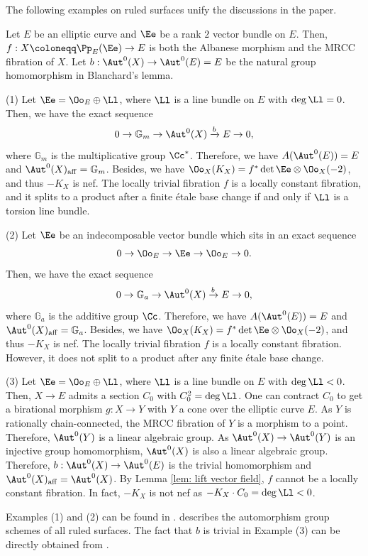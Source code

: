 \documentclass[11pt]{amsart}
\begin{document}
\begin{example}
The following examples on ruled surfaces unify the discussions in the paper. 

Let $E$ be an elliptic curve and $\Ee$ be a rank $2$ vector bundle on $E$. Then, $f: X \coloneqq \Pp_E(\Ee) \to E$ is both the Albanese morphism and the MRCC fibration of $X$. Let $b: \Aut^0(X) \to \Aut^0(E)=E$ be the natural group homomorphism in Blanchard's lemma.

(1) Let $\Ee = \Oo_E \oplus \Ll$, where $\Ll$ is a line bundle on $E$ with $\deg \Ll =0$. Then, we have the exact sequence 
\[
0 \to {\mathbb G}_m \to \Aut^0(X) \xrightarrow{b} E \to 0,
\] where ${\mathbb G}_m$ is the multiplicative group $\Cc^*$. Therefore, we have $A(\Aut^0(E))=E$ and $\Aut^0(X)_{\rm aff}={\mathbb G}_m$. Besides, we have $\Oo_X(K_X)=f^*\det \Ee \otimes \Oo_X(-2)$, and thus $-K_X$ is nef. The locally trivial fibration $f$ is a locally constant fibration, and it splits to a product after a finite \'etale base change if and only if $\Ll$ is a torsion line bundle.

(2) Let $\Ee$ be an indecomposable vector bundle which sits in an exact sequence 
\[
0 \to \Oo_E \to \Ee \to \Oo_E \to 0.
\]Then, we have the exact sequence 
\[
0 \to {\mathbb G}_a \to \Aut^0(X) \xrightarrow{b} E \to 0,
\] where ${\mathbb G}_a$ is the additive group $\Cc$. Therefore, we have $A(\Aut^0(E))=E$ and $\Aut^0(X)_{\rm aff}={\mathbb G}_a$. Besides, we have $\Oo_X(K_X)=f^*\det \Ee \otimes \Oo_X(-2)$, and thus $-K_X$ is nef. The locally trivial fibration $f$ is a locally constant fibration. However, it does not split to a product after any finite \'etale base change.

(3) Let $\Ee = \Oo_E \oplus \Ll$, where $\Ll$ is a line bundle on $E$ with $\deg \Ll <0$. Then, $X \to E$ admits a section $C_0$ with $C^2_0 = \deg \Ll$. One can contract $C_0$ to get a birational morphism $g: X \to Y$ with $Y$ a cone over the elliptic curve $E$. As $Y$ is rationally chain-connected, the MRCC fibration of $Y$ is a morphism to a point. Therefore, $\Aut^0(Y)$ is a linear algebraic group. As $\Aut^0(X) \to \Aut^0(Y)$ is an injective group homomorphism, $\Aut^0(X)$ is also a linear algebraic group. Therefore, $b: \Aut^0(X) \to \Aut^0(E)$ is the trivial homomorphism and $\Aut^0(X)_{\rm aff}=\Aut^0(X)$. By Lemma \ref{lem: lift vector field}, $f$ cannot be a locally constant fibration. In fact, $-K_X$ is not nef as $-K_X\cdot C_0 = \deg \Ll <0$.

Examples (1) and (2) can be found in \cite[Example 4.2.4]{BSU13}. \cite[Theorem 3]{Mar71} describes the automorphism group schemes of all ruled surfaces. The fact that $b$ is trivial in Example (3) can be directly obtained from \cite[Lemma 7]{Mar71}.
\end{example}






\end{document}
